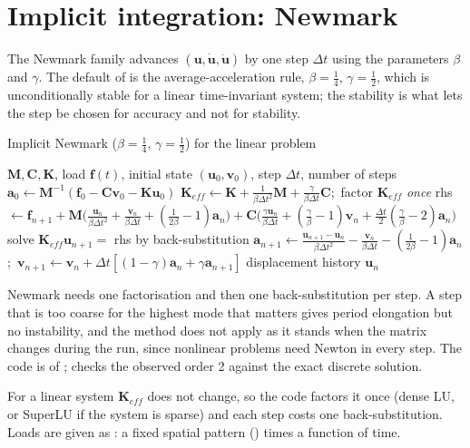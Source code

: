 \section{Implicit integration: Newmark}\label{sec:dy-newmark}

The Newmark family \citep{newmark1959} advances $(\bm u,\dot{\bm u},\ddot{\bm u})$ by one step $\Delta t$ using the parameters $\beta$ and $\gamma$. The default of  is the average-acceleration rule, $\beta=\tfrac14$, $\gamma=\tfrac12$, which is unconditionally stable for a linear time-invariant system; the stability is what lets the step be chosen for accuracy and not for stability.

\begin{algbox}{Implicit Newmark ($\beta=\tfrac14$, $\gamma=\tfrac12$) for the linear problem}
\begin{pseudo}
\Require $\bm M,\bm C,\bm K$, load $\bm f(t)$, initial state $(\bm u_0,\bm v_0)$, step $\Delta t$, number of steps
\State $\bm a_0\gets\bm M^{-1}(\bm f_0-\bm C\bm v_0-\bm K\bm u_0)$
\State $\bm K_{eff}\gets\bm K+\frac{1}{\beta\Delta t^2}\bm M+\frac{\gamma}{\beta\Delta t}\bm C$;\ factor $\bm K_{eff}$ \emph{once}
  \State rhs $\gets\bm f_{n+1}+\bm M\big(\tfrac{\bm u_n}{\beta\Delta t^2}+\tfrac{\bm v_n}{\beta\Delta t}+(\tfrac1{2\beta}-1)\bm a_n\big)+\bm C\big(\tfrac{\gamma\bm u_n}{\beta\Delta t}+(\tfrac\gamma\beta-1)\bm v_n+\tfrac{\Delta t}2(\tfrac\gamma\beta-2)\bm a_n\big)$
  \State solve $\bm K_{eff}\bm u_{n+1}=$ rhs by back-substitution
  \State $\bm a_{n+1}\gets\frac{\bm u_{n+1}-\bm u_n}{\beta\Delta t^2}-\frac{\bm v_n}{\beta\Delta t}-(\tfrac1{2\beta}-1)\bm a_n$;\ $\bm v_{n+1}\gets\bm v_n+\Delta t[(1-\gamma)\bm a_n+\gamma\bm a_{n+1}]$
\EndFor
\Ensure displacement history $\bm u_n$
\end{pseudo}
\end{algbox}

Newmark needs one factorisation and then one back-substitution per step. A step that is too coarse for the highest mode that matters gives period elongation but no instability, and the method does not apply as it stands when the matrix changes during the run, since nonlinear problems need Newton in every step. The code is  of ;  checks the observed order 2 against the exact discrete solution.

For a linear system $\bm K_{eff}$ does not change, so the code factors it once (dense LU, or SuperLU if the system is sparse) and each step costs one back-substitution. Loads are given as : a fixed spatial pattern () times a function of time.

